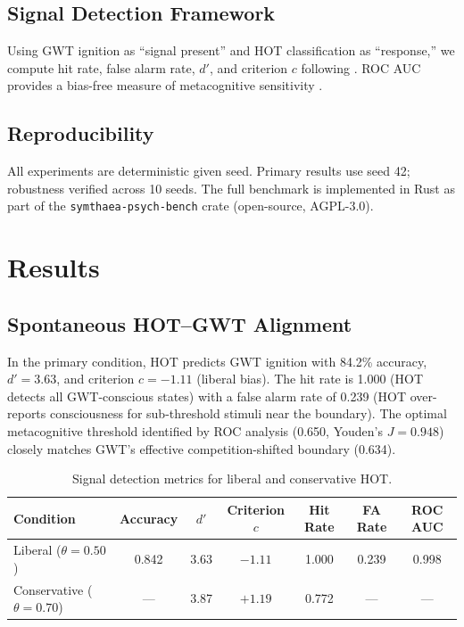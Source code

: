 \documentclass[10pt,letterpaper]{article}
\newcommand{\dprime}{d'}
\begin{document}
\subsection{Signal Detection Framework}

Using GWT ignition as ``signal present'' and HOT classification as
``response,'' we compute hit rate, false alarm rate, $\dprime$, and
criterion $c$ following \citet{macmillan2005detection}.  ROC AUC
provides a bias-free measure of metacognitive sensitivity
\citep{green1966signal}.

\subsection{Reproducibility}

All experiments are deterministic given seed.  Primary results use
seed 42; robustness verified across 10 seeds.  The full benchmark
is implemented in Rust as part of the \texttt{symthaea-psych-bench}
crate (open-source, AGPL-3.0).


\section{Results}

\subsection{Spontaneous HOT--GWT Alignment}

In the primary condition, HOT predicts GWT ignition with 84.2\%
accuracy, $\dprime = 3.63$, and criterion $c = -1.11$ (liberal bias).
The hit rate is 1.000 (HOT detects all GWT-conscious states) with a
false alarm rate of 0.239 (HOT over-reports consciousness for
sub-threshold stimuli near the boundary).  The optimal metacognitive
threshold identified by ROC analysis (0.650, Youden's $J = 0.948$)
closely matches GWT's effective competition-shifted boundary (0.634).

\begin{table}[t]
\centering
\caption{Signal detection metrics for liberal and conservative HOT.}
\label{tab:sdt}
\small
\begin{tabular}{@{}lcccccc@{}}
\toprule
Condition & Accuracy & $\dprime$ & Criterion $c$ & Hit Rate & FA Rate & ROC AUC \\
\midrule
Liberal ($\theta = 0.50$)       & 0.842 & 3.63 & $-1.11$ & 1.000 & 0.239 & 0.998 \\
Conservative ($\theta = 0.70$)  & ---   & 3.87 & $+1.19$ & 0.772 & ---   & ---   \\
\bottomrule
\end{tabular}
\end{table}
\end{document}
